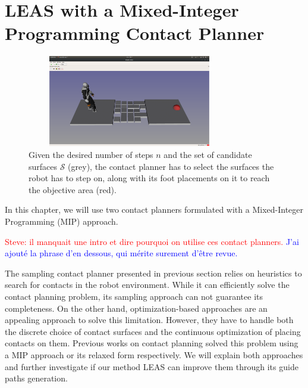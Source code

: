 

\chapter{LEAS with a Mixed-Integer Programming Contact Planner}
\label{sec:CP-SL1M}
\minitoc
\bigskip

\begin{figure}[ht]
    \centering
    \captionsetup[subfigure]{justification=centering}
    \includegraphics[trim={8cm 7cm 7.5cm 9cm},clip,width=0.8\textwidth,height=4cm]{Figures/Chapter_MIP_SL1M/rubbles/rubbles_empty.png}
    \caption{Given the desired number of steps $n$ and the set of candidate surfaces $\mathcal{S}$ (grey), the contact planner has to select the surfaces the robot has to step on, along with its foot placements on it to reach the objective area (red).\label{fig:rubbles:empty}}
\end{figure}

In this chapter, we will use two contact planners formulated with a Mixed-Integer Programming (MIP) approach.

\textcolor{red}{Steve: il manquait une intro et dire pourquoi on utilise ces contact planners.}
\textcolor{blue}{J'ai ajouté la phrase d'en dessous, qui mérite surement d'être revue.}

The sampling contact planner presented in previous section relies on heuristics to search for contacts in the robot environment.
While it can efficiently solve the contact planning problem, its sampling approach can not guarantee its completeness.
On the other hand, optimization-based approaches are an appealing approach to solve this limitation. However, they have to handle both the discrete choice of contact surfaces and the continuous optimization of placing contacts on them.
Previous works on contact planning \cite{deits2014FootPlanMI, sl1m_v2} solved this problem using a MIP approach or its relaxed form respectively.
We will explain both approaches and further investigate if our method LEAS can improve them through its guide paths generation.

